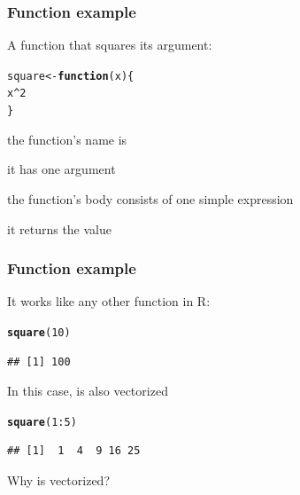\documentclass[12pt]{beamer}\usepackage[]{graphicx}\usepackage[]{color}
\makeatletter
\newcommand{\hlnum}[1]{\textcolor[rgb]{0.686,0.059,0.569}{#1}}%
\newcommand{\hlopt}[1]{\textcolor[rgb]{0,0,0}{#1}}%
\newcommand{\hlstd}[1]{\textcolor[rgb]{0.345,0.345,0.345}{#1}}%
\newcommand{\hlkwa}[1]{\textcolor[rgb]{0.161,0.373,0.58}{\textbf{#1}}}%
\newcommand{\hlkwb}[1]{\textcolor[rgb]{0.69,0.353,0.396}{#1}}%
\newcommand{\hlkwc}[1]{\textcolor[rgb]{0.333,0.667,0.333}{#1}}%
\newcommand{\hlkwd}[1]{\textcolor[rgb]{0.737,0.353,0.396}{\textbf{#1}}}%
\newenvironment{kframe}{%
 \def\at@end@of@kframe{}%
 \ifinner\ifhmode%
  \def\at@end@of@kframe{\end{minipage}}%
  \begin{minipage}{\columnwidth}%
 \fi\fi%
 \def\FrameCommand##1{\hskip\@totalleftmargin \hskip-\fboxsep
 \colorbox{shadecolor}{##1}\hskip-\fboxsep
     \hskip-\linewidth \hskip-\@totalleftmargin \hskip\columnwidth}%
 \MakeFramed {\advance\hsize-\width
   \@totalleftmargin\z@ \linewidth\hsize
   \@setminipage}}%
 {\par\unskip\endMakeFramed%
 \at@end@of@kframe}
\newenvironment{knitrout}{}{} %
\makeatother
\begin{document}

\begin{frame}[fragile]
\frametitle{Function example}

A function that squares its argument:
\begin{knitrout}\footnotesize
{}\color{fgcolor}\begin{kframe}
\begin{alltt}
\hlstd{square} \hlkwb{<-} \hlkwa{function}\hlstd{(}\hlkwc{x}\hlstd{) \{}
  \hlstd{x}\hlopt{^}\hlnum{2}
\hlstd{\}}
\end{alltt}
\end{kframe}
\end{knitrout}

\pause
\bi
  \item the function's name is {\hilit {}}
  \item it has one argument {\hilit {}}
  \item the function's body consists of one simple expression
  \item it returns the value {\hilit {}}  
\ei

\end{frame}


\begin{frame}[fragile]
\frametitle{Function example}

It works like any other function in R:
\begin{knitrout}\footnotesize
{}\color{fgcolor}\begin{kframe}
\begin{alltt}
\hlkwd{square}\hlstd{(}\hlnum{10}\hlstd{)}
\end{alltt}
\begin{verbatim}
## [1] 100
\end{verbatim}
\end{kframe}
\end{knitrout}

In this case,  is also vectorized
\begin{knitrout}\footnotesize
{}\color{fgcolor}\begin{kframe}
\begin{alltt}
\hlkwd{square}\hlstd{(}\hlnum{1}\hlopt{:}\hlnum{5}\hlstd{)}
\end{alltt}
\begin{verbatim}
## [1]  1  4  9 16 25
\end{verbatim}
\end{kframe}
\end{knitrout}
Why is  vectorized?

\end{frame}
\end{document}
